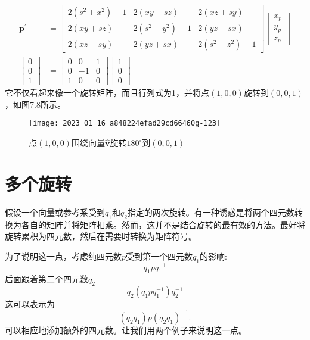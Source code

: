 $$
\begin{aligned}
\mathbf{p}^{\prime} & =\left[\begin{array}{ccc}
2\left(s^{2}+x^{2}\right)-1 & 2(x y-s z) & 2(x z+s y) \\
2(x y+s z) & 2\left(s^{2}+y^{2}\right)-1 & 2(y z-s x) \\
2(x z-s y) & 2(y z+s x) & 2\left(s^{2}+z^{2}\right)-1
\end{array}\right]\left[\begin{array}{l}
x_{p} \\
y_{p} \\
z_{p}
\end{array}\right] \\
{\left[\begin{array}{l}
0 \\
0 \\
1
\end{array}\right] } & =\left[\begin{array}{ccc}
0 & 0 & 1 \\
0 & -1 & 0 \\
1 & 0 & 0
\end{array}\right]\left[\begin{array}{l}
1 \\
0 \\
0
\end{array}\right]
\end{aligned}
$$
它不仅看起来像一个旋转矩阵，而且行列式为1，并将点$(1,0,0)$旋转到$(0,0,1)$，如图7.8所示。

\begin{figure}[h!]
    \centering
    \texttt{[image: 2023\_01\_16\_a848224efad29cd66460g-123]}
    \caption[short]{点$(1,0,0)$围绕向量$\hat{\mathbf{v}}$旋转$180^{\circ}$到$(0,0,1)$}
\end{figure}

\section{多个旋转}
假设一个向量或参考系受到$q_{1}$和$q_{2}$指定的两次旋转。有一种诱惑是将两个四元数转换为各自的矩阵并将矩阵相乘。然而，这并不是结合旋转的最有效的方法。最好将旋转累积为四元数，然后在需要时转换为矩阵符号。

为了说明这一点，考虑纯四元数$p$受到第一个四元数$q_{1}$的影响:
$$
q_{1} p q_{1}^{-1}
$$
后面跟着第二个四元数$q_{2}$
$$
q_{2}\left(q_{1} p q_{1}^{-1}\right) q_{2}^{-1}
$$
这可以表示为
$$
\left(q_{2} q_{1}\right) p\left(q_{2} q_{1}\right)^{-1} .
$$
可以相应地添加额外的四元数。让我们用两个例子来说明这一点。

